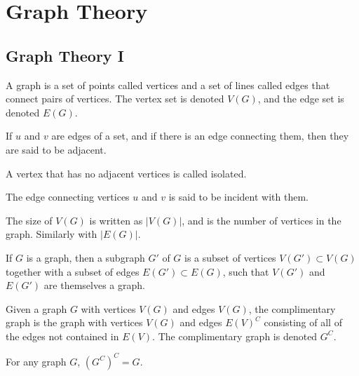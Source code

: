 \chapter{Graph Theory}
    \section{Graph Theory I}
        \begin{definition}
            A graph is a set of points called vertices and a set of lines called
            edges that connect pairs of vertices. The vertex set is denoted
            $V(G)$, and the edge set is denoted $E(G)$.
        \end{definition}
        \begin{definition}
            If $u$ and $v$ are edges of a set, and if there is an edge
            connecting them, then they are said to be adjacent. 
        \end{definition}
        \begin{definition}
            A vertex that has no adjacent vertices is called isolated.
        \end{definition}
        \begin{definition}
            The edge connecting vertices $u$ and $v$ is said to be incident
            with them.
        \end{definition}
        \begin{definition}
            The size of $V(G)$ is written as $|V(G)|$, and is the number of
            vertices in the graph. Similarly with $|E(G)|$.
        \end{definition}
        \begin{definition}
            If $G$ is a graph, then a subgraph $G'$ of $G$ is a subset of
            vertices $V(G')\subset{V(G)}$ together with a subset of edges
            $E(G')\subset{E(G)}$, such that $V(G')$ and $E(G')$ are themselves
            a graph.
        \end{definition}
        \begin{definition}
            Given a graph $G$ with vertices $V(G)$ and edges $V(G)$, the
            complimentary graph is the graph with vertices $V(G)$ and edges
            $E(V)^C$ consisting of all of the edges not contained in $E(V)$. The
            complimentary graph is denoted $G^C$.
        \end{definition}
        \begin{theorem}
            For any graph $G$, $(G^C)^{C}=G$.
        \end{theorem}
